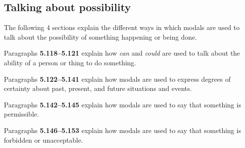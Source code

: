 \documentclass[oneside]{book}
\numberwithin{equation}{section}
\begin{document}
\subsection{Talking about possibility}
\noindent{} The following 4 sections explain the different ways in which modals are used to talk about the possibility of something happening or being done.

%
Paragraphs \textbf{5.118--5.121} explain how \textit{can} and \textit{could} are used to talk about the ability of a person or thing to do something.

%
Paragraphs \textbf{5.122--5.141} explain how modals are used to express degrees of certainty about past, present, and future situations and events.

%
Paragraphs \textbf{5.142--5.145} explain how modals are used to say that something is permissible.

%
Paragraphs \textbf{5.146--5.153} explain how modals are used to say that something is forbidden or unacceptable.
\end{document}
